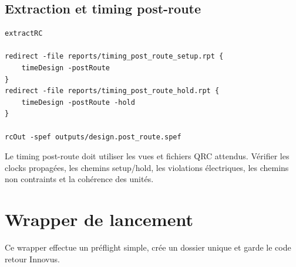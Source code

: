 \documentclass[11pt,a4paper,openany]{report}
\begin{document}
\section{Extraction et timing post-route}

\begin{lstlisting}[style=guidecode,language=TclGuide]
extractRC

redirect -file reports/timing_post_route_setup.rpt {
    timeDesign -postRoute
}
redirect -file reports/timing_post_route_hold.rpt {
    timeDesign -postRoute -hold
}

rcOut -spef outputs/design.post_route.spef
\end{lstlisting}

Le timing post-route doit utiliser les vues et fichiers QRC attendus. Vérifier
les clocks propagées, les chemins setup/hold, les violations électriques, les
chemins non contraints et la cohérence des unités.

\chapter{Wrapper de lancement}

Ce wrapper effectue un préflight simple, crée un dossier unique et garde le
code retour Innovus.
\end{document}
